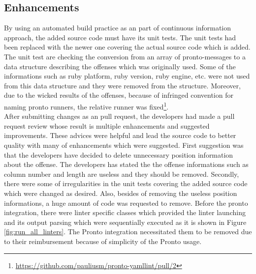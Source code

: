 \subsection{Enhancements}

By using an automated build practice as an part of continuous information approach, the added source code must have its unit tests. The unit tests had been replaced with the newer one covering the actual source code which is added. The unit test are checking the conversion from an array of pronto-messages to a data structure describing the offenses which was originally used. Some of the informations such as ruby platform, ruby version, ruby engine, etc. were not used from this data structure and they were removed from the structure. Moreover, due to the wicked results of the offenses, because of infringed convention for naming pronto runners, the relative runner was fixed\footnote{\url{https://github.com/pauliusm/pronto-yamllint/pull/2}}.\\

After submitting changes as an pull request, the developers had made a pull request review whose result is multiple enhancements and suggested improvements. These advices were helpful and lead the source code to better quality with many of enhancements which were suggested. First suggestion was that the developers have decided to delete unnecessary position information about the offense. The developers has stated the the offense informations such as column number and length are useless and they should be removed. Secondly, there were some of irregularities in the unit tests covering the added source code which were changed as desired. Also, besides of removing the useless position informations, a huge amount of code was requested to remove. Before the pronto integration, there were linter specific classes which provided the linter launching and its output parsing which were sequentially executed as it is shown in Figure \ref{fig:run_all_linters}. The Pronto integration necessitated them to be removed due to their reimbursement because of simplicity of the Pronto usage.\\

